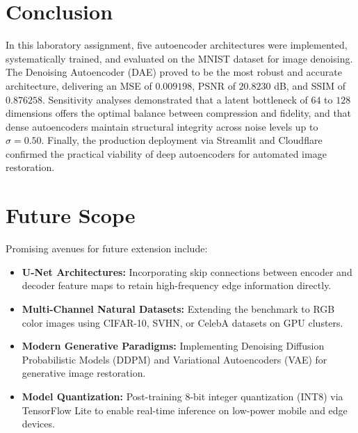 \documentclass[12pt, a4paper]{article}
\begin{document}
\section{Conclusion}

In this laboratory assignment, five autoencoder architectures were implemented, systematically trained, and evaluated on the MNIST dataset for image denoising. The Denoising Autoencoder (DAE) proved to be the most robust and accurate architecture, delivering an MSE of $0.009198$, PSNR of $20.8230$ dB, and SSIM of $0.876258$. Sensitivity analyses demonstrated that a latent bottleneck of $64$ to $128$ dimensions offers the optimal balance between compression and fidelity, and that dense autoencoders maintain structural integrity across noise levels up to $\sigma = 0.50$. Finally, the production deployment via Streamlit and Cloudflare confirmed the practical viability of deep autoencoders for automated image restoration.


\section{Future Scope}

Promising avenues for future extension include:
\begin{itemize}[noitemsep]
    \item \textbf{U-Net Architectures:} Incorporating skip connections between encoder and decoder feature maps to retain high-frequency edge information directly.
    \item \textbf{Multi-Channel Natural Datasets:} Extending the benchmark to RGB color images using CIFAR-10, SVHN, or CelebA datasets on GPU clusters.
    \item \textbf{Modern Generative Paradigms:} Implementing Denoising Diffusion Probabilistic Models (DDPM) and Variational Autoencoders (VAE) for generative image restoration.
    \item \textbf{Model Quantization:} Post-training 8-bit integer quantization (INT8) via TensorFlow Lite to enable real-time inference on low-power mobile and edge devices.
\end{itemize}

\vspace{0.8cm}
\end{document}
